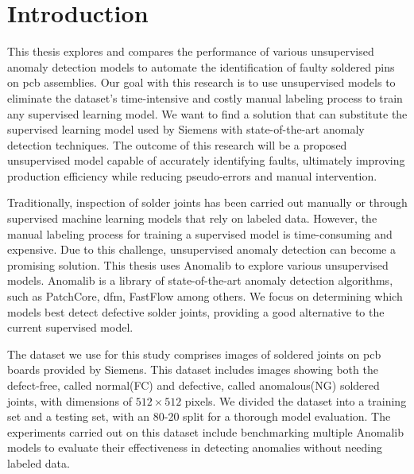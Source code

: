 \chapter{Introduction}
\label{sec:introduction}

This thesis explores and compares the performance of various unsupervised anomaly detection models to automate the identification of faulty soldered pins on \gls{pcb} assemblies. Our goal with this research is to use unsupervised models to eliminate the dataset's time-intensive and costly manual labeling process to train any supervised learning model. We want to find a solution that can substitute the supervised learning model used by Siemens with state-of-the-art anomaly detection techniques. The outcome of this research will be a proposed unsupervised model capable of accurately identifying faults, ultimately improving production efficiency while reducing pseudo-errors and manual intervention.

Traditionally, inspection of solder joints has been carried out manually or through supervised machine learning models that rely on labeled data. However, the manual labeling process for training a supervised model is time-consuming and expensive. Due to this challenge, unsupervised anomaly detection can become a promising solution. This thesis uses Anomalib\cite{Anomalib2024} to explore various unsupervised models. Anomalib is a library of state-of-the-art anomaly detection algorithms, such as PatchCore\cite{roth2022totalrecallindustrialanomaly}, \gls{dfm}\cite{ahuja2019probabilisticmodelingdeepfeatures}, FastFlow\cite{yu2021fastflowunsupervisedanomalydetection} among others. We focus on determining which models best detect defective solder joints, providing a good alternative to the current supervised model. %

The dataset we use for this study comprises images of soldered joints on \gls{pcb} boards provided by Siemens. This dataset includes images showing both the defect-free, called normal(FC) and defective, called anomalous(NG) soldered joints, with dimensions of $512\times512$ pixels. We divided the dataset into a training set and a testing set, with an 80-20 split for a thorough model evaluation. The experiments carried out on this dataset include benchmarking multiple Anomalib models to evaluate their effectiveness in detecting anomalies without needing labeled data.

